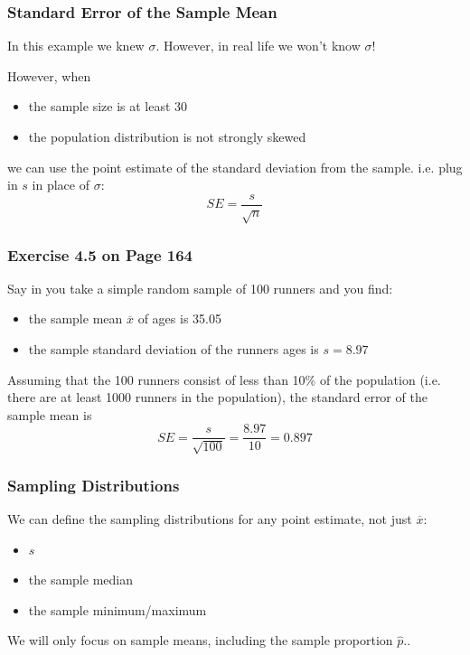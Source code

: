 \documentclass[handout]{beamer}
\newcommand{\blue}[1]{\textcolor{blue2}{#1}}
\newcommand{\xbar}{\overline{x}}
\begin{document}
\begin{frame}[fragile]
\frametitle{Standard Error of the Sample Mean}
In this example we knew $\sigma$.  However, in real life we won't know $\sigma$!

\vspace{0.5cm}

\pause However, when
\begin{itemize}
\pause \item the sample size is at least 30
\pause \item the population distribution is \blue{not} strongly skewed
\end{itemize}
\pause we can use the point estimate of the standard deviation from the sample.  i.e. plug in $s$ in place of $\sigma$:
\[
SE = \frac{s}{\sqrt{n}}
\]

\end{frame}



\begin{frame}[fragile]
\frametitle{Exercise 4.5 on Page 164}

Say in you take a simple random sample of 100 runners and you find:
\begin{itemize}
\item the sample mean $\xbar$ of ages is 35.05
\item the sample standard deviation of the runners ages is $s=8.97$
\end{itemize}

\vspace{0.5cm}

\pause Assuming that the 100 runners consist of less than 10\% of the population (i.e. there are at least 1000 runners in the population), the standard error of the sample mean is 
\[
SE = \frac{s}{\sqrt{100}} = \frac{8.97}{10} = 0.897
\]


\end{frame}


\begin{frame}[fragile]
\frametitle{Sampling Distributions}

We can define the sampling distributions for \blue{any} point estimate, not just $\xbar$:
\begin{itemize}
\item $s$
\item the sample median
\item the sample minimum/maximum
\end{itemize}

\pause We will only focus on sample means, including the sample proportion $\widehat{p}$..

\end{frame}
\end{document}
